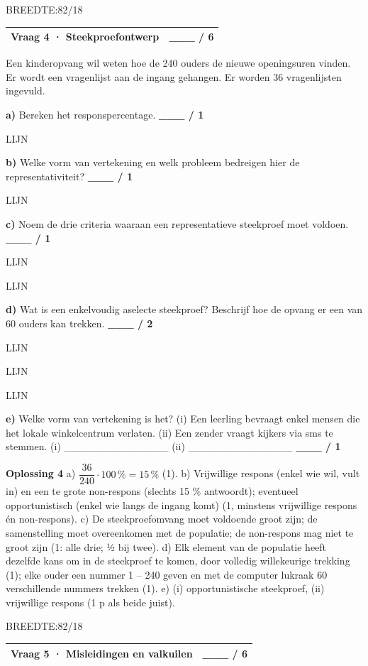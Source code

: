 \documentclass{article}
\newcommand{\lijn}{\par LIJN\par}
\newcommand{\breedtes}[1]{\par BREEDTE:#1\par}
\begin{document}
\breedtes{82/18}
\begin{tabular}{lc}
\hline
Vraag 4 · Steekproefontwerp & \_\_\_ / 6 \\
\hline
\end{tabular}

Een kinderopvang wil weten hoe de 240 ouders de nieuwe openingsuren vinden. Er wordt een vragenlijst aan de ingang gehangen. Er worden 36 vragenlijsten ingevuld.

\textbf{a)} Bereken het responspercentage. \hfill \textbf{\_\_\_ / 1} \lijn 

\textbf{b)} Welke vorm van vertekening en welk probleem bedreigen hier de representativiteit? \hfill \textbf{\_\_\_ / 1} \lijn 

\textbf{c)} Noem de drie criteria waaraan een representatieve steekproef moet voldoen. \hfill \textbf{\_\_\_ / 1} \lijn \lijn 

\textbf{d)} Wat is een enkelvoudig aselecte steekproef? Beschrijf hoe de opvang er een van 60 ouders kan trekken. \hfill \textbf{\_\_\_ / 2} \lijn \lijn \lijn 

\textbf{e)} Welke vorm van vertekening is het? (i) Een leerling bevraagt enkel mensen die het lokale winkelcentrum verlaten. (ii) Een zender vraagt kijkers via sms te stemmen. (i) \_\_\_\_\_\_\_\_\_\_\_\_\_\_ (ii) \_\_\_\_\_\_\_\_\_\_\_\_\_\_ \hfill \textbf{\_\_\_ / 1} 

\begin{oplossing}
\textbf{Oplossing 4} \quad a) $\dfrac{36}{240}\cdot 100\,\%=15\,\%$ (1). b) Vrijwillige respons (enkel wie wil, vult in) en een te grote non-respons (slechts 15 \% antwoordt); eventueel opportunistisch (enkel wie langs de ingang komt) (1, minstens vrijwillige respons én non-respons). c) De steekproefomvang moet voldoende groot zijn; de samenstelling moet overeenkomen met de populatie; de non-respons mag niet te groot zijn (1: alle drie; ½ bij twee). d) Elk element van de populatie heeft dezelfde kans om in de steekproef te komen, door volledig willekeurige trekking (1); elke ouder een nummer 1 – 240 geven en met de computer lukraak 60 verschillende nummers trekken (1). e) (i) opportunistische steekproef, (ii) vrijwillige respons (1 p als beide juist).
\end{oplossing}

\breedtes{82/18}
\begin{tabular}{lc}
\hline
Vraag 5 · Misleidingen en valkuilen & \_\_\_ / 6 \\
\hline
\end{tabular}
\end{document}
